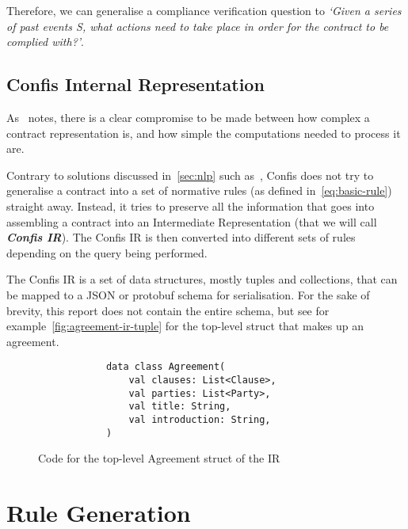 Therefore, we can generalise a compliance verification question to \textit{`Given a series of past events S, what actions need to take place in order for the contract to be complied with?'}.


\subsection{Confis Internal Representation}\label{subsec:confis-ir}
As~\cite{knottenbeltContractDriven} notes, there is a clear compromise to be made between how complex a contract representation is, and how simple the computations needed to process it are.

Contrary to solutions discussed in~\autoref{sec:nlp} such as~\cite{sleimi2018NLP4}, Confis does not try to generalise a contract into a set of normative rules (as defined in~\autoref{eq:basic-rule}) straight away.
Instead, it tries to preserve all the information that goes into assembling a contract into an Intermediate Representation (that we will call \textbf{\emph{Confis IR}}).
The Confis IR is then converted into different sets of rules depending on the query being performed.

The Confis IR is a set of data structures, mostly tuples and collections, that can be mapped to a JSON or protobuf schema for serialisation.
For the sake of brevity, this report does not contain the entire schema, but see for example~\autoref{fig:agreement-ir-tuple} for the top-level struct that makes up an agreement.

\begin{figure}[h]
    \centering
    \begin{minipage}{0.5\textwidth}
        \begin{verbatim}
            data class Agreement(
                val clauses: List<Clause>,
                val parties: List<Party>,
                val title: String,
                val introduction: String,
            )
        \end{verbatim}
    \end{minipage}
    \caption{Code for the top-level Agreement struct of the IR}
    \label{fig:agreement-ir-tuple}
\end{figure}



\section{Rule Generation}\label{sec:rule-generation}

